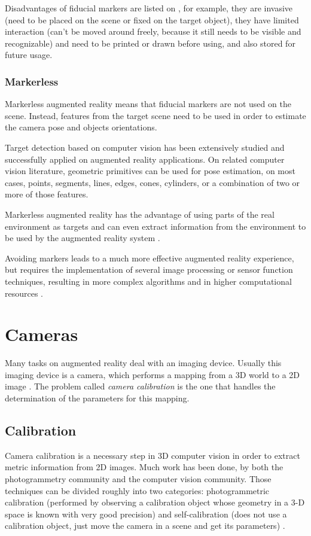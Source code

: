 \documentclass[msc, a4paper, classic, en]{ufbathesis}
\begin{document}
Disadvantages of fiducial markers are listed on \cite{dolz}, for example, they are invasive (need to be placed on the scene or fixed on the target object), they have limited interaction (can't be moved around freely, because it still needs to be visible and recognizable) and need to be printed or drawn before using, and also stored for future usage.

\subsubsection{Markerless}

Markerless augmented reality means that fiducial markers are not used on the scene. Instead, features from the target scene need to be used in order to estimate the camera pose and objects orientations.

Target detection based on computer vision has been extensively studied and successfully applied on augmented reality applications. On related computer vision literature, geometric primitives can be used for pose estimation, on most cases, points, segments, lines, edges, cones, cylinders, or a combination of two or more of those features.

Markerless augmented reality has the advantage of using parts of the real environment as targets and can even extract information from the environment to be used by the augmented reality system \cite{dolz}.

Avoiding markers leads to a much more effective augmented reality experience, but requires the implementation of several image processing or sensor function techniques, resulting in more complex algorithms and in higher computational resources \cite{shumaker2011virtual}.

\section{Cameras}

Many tasks on augmented reality deal with an imaging device. Usually this imaging device is a camera, which performs a mapping from a 3D world to a 2D image \cite{hanning2011high}. The problem called \textit{camera calibration} is the one that handles the determination of the parameters for this mapping.

\subsection{Calibration}

Camera calibration is a necessary step in 3D computer vision in order to extract metric information from 2D images. Much work has been done, by both the photogrammetry community and the computer vision community. Those techniques can be divided roughly into two categories: photogrammetric calibration (performed by observing a calibration object whose geometry in a 3-D space is known with very good precision) and self-calibration (does not use a calibration object, just move the camera in a scene and get its parameters) \cite{zhang2000flexible}.
\end{document}
